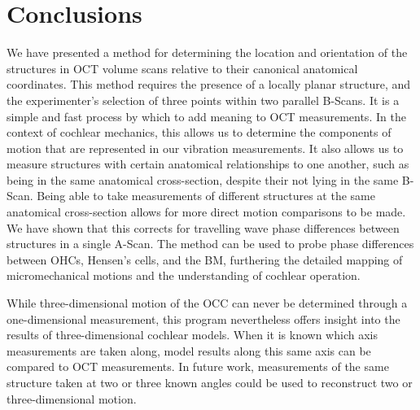 \documentclass[preprint,NumberedRefs]{JASA}
\begin{document}
\section{Conclusions}
\par{We have presented a method for determining the location and orientation of the structures in OCT volume scans relative to their canonical anatomical coordinates. This method requires the presence of a locally planar structure, and the experimenter's selection of three points within two parallel B-Scans. It is a simple and fast process by which to add meaning to OCT measurements. In the context of cochlear mechanics, this allows us to determine the components of motion that are represented in our vibration measurements. It also allows us to measure structures with certain anatomical relationships to one another, such as being in the same anatomical cross-section, despite their not lying in the same B-Scan. Being able to take measurements of different structures at the same anatomical cross-section allows for more direct motion comparisons to be made. We have shown that this corrects for travelling wave phase differences between structures in a single A-Scan. The method can be used to probe phase differences between OHCs, Hensen's cells, and the BM, furthering the detailed mapping of micromechanical motions and the understanding of cochlear operation.}
\par{While three-dimensional motion of the OCC can never be determined through a one-dimensional measurement, this program nevertheless offers insight into the results of three-dimensional cochlear models. When it is known which axis measurements are taken along, model results along this same axis can be compared to OCT measurements. In future work, measurements of the same structure taken at two or three known angles could be used to reconstruct two or three-dimensional motion.}

\clearpage

\end{document}
